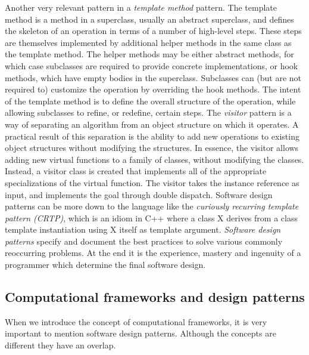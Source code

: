 \quad Another very relevant pattern in a \textit{template method} pattern. The template method is a method in a superclass, usually an abstract superclass, and defines the skeleton of an operation in terms of a number of high-level steps. These steps are themselves implemented by additional helper methods in the same class as the template method. The helper methods may be either abstract methods, for which case subclasses are required to provide concrete implementations, or hook methods, which have empty bodies in the superclass. Subclasses can (but are not required to) customize the operation by overriding the hook methods. The intent of the template method is to define the overall structure of the operation, while allowing subclasses to refine, or redefine, certain steps.\newline\null
\quad The \textit{visitor} pattern is a way of separating an algorithm from an object structure on which it operates. A practical result of this separation is the ability to add new operations to existing object structures without modifying the structures. In essence, the visitor allows adding new virtual functions to a family of classes, without modifying the classes. Instead, a visitor class is created that implements all of the appropriate specializations of the virtual function. The visitor takes the instance reference as input, and implements the goal through double dispatch.\newline\null
\quad Software design patterns can be more down to the language like the \textit{curiously recurring template pattern (CRTP)}, which is an idiom in C++ where a class X derives from a class template instantiation using X itself as template argument.\newline\null
\quad \textit{Software design patterns} specify and document the best practices to solve various commonly reoccurring problems. At the end it is the experience, mastery and ingenuity of a programmer which determine the final software design.  

\subsection{Computational frameworks and design patterns}
\label{background_design_frameworks}
\quad When we introduce the concept of computational frameworks, it is very important to mention software design patterns. Although the concepts are different they have an overlap. 



